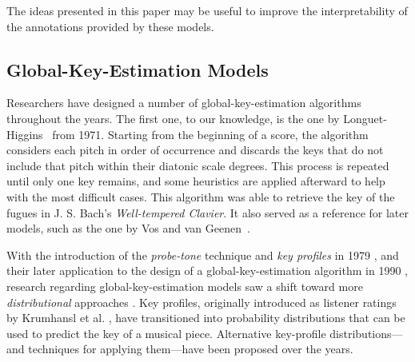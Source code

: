 The ideas presented in this paper may be useful to improve the interpretability of the annotations provided by these models.



\subsection{Global-Key-Estimation Models}
Researchers have designed a number of global-key-estimation algorithms throughout the years. 
The first one, to our knowledge, is the one by Longuet-Higgins~\cite{longuet1971tonality} from 1971.
Starting from the beginning of a score, the algorithm considers each pitch in order of occurrence and discards the keys that do not include that pitch within their diatonic scale degrees. 
This process is repeated until only one key remains, and some heuristics are applied afterward to help with the most difficult cases. This algorithm was able to retrieve the key of the fugues in J. S. Bach's \emph{Well-tempered Clavier}. 
It also served as a reference for later models, such as the one by Vos and van Geenen~\cite{vos96keyfinding}.

With the introduction of the \emph{probe-tone} technique and \emph{key profiles} in 1979 \cite{krumhansl_quantification_1979}, and their later application to the design of a global-key-estimation algorithm in 1990 \cite{krumhansl_cognitive_1990}, research regarding global-key-estimation models saw a shift toward more \emph{distributional} approaches \cite{temperley2008pitch}. 
Key profiles, originally introduced as listener ratings by Krumhansl et al. \cite{krumhansl_quantification_1979, krumhansl_tracing_1982}, have transitioned into probability distributions that can be used to predict the key of a musical piece.
Alternative key-profile distributions---and techniques for applying them---have been proposed over the years.


